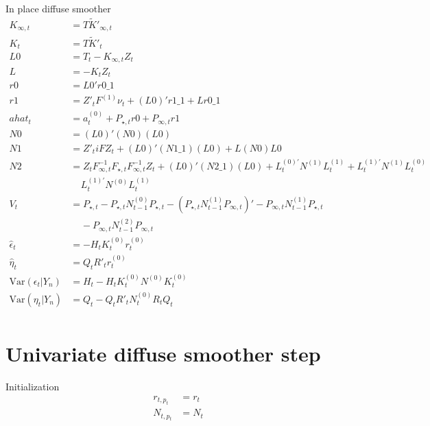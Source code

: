 \documentclass{article}
\begin{document}
In place diffuse smoother
\begin{align*}
  K_{\infty,t} &= T\tilde K'_{\infty,t} \\
  K_t &= T\tilde K'_t \\
  L0 &= T_t - K_{\infty,t}Z_t \\
  L &= - K_tZ_t \\
  r0 &= L0'r0\_1 \\
  r1 &= Z'_tF^{(1)}\nu_t + (L0)'r1\_1 +
                  Lr0\_1 \\
    ahat_t &= a^{(0)}_t + P_{\star,t}r0  +
             P_{\infty,t}r1 \\
  N0 &= (L0)'(N0)(L0) \\
  N1 &= Z'_tiFZ_t + (L0)'(N1\_1)(L0)
                  +L(N0)L0
                  \\
  N2 &= Z_tF^{-1}_{\infty,t}F_{\star,t}F^{-1}_{\infty,t}Z_t + (L0)'(N2\_1)(L0) +
                  L^{(0)'}_tN^{(1)}L^{(1)}_t +
                  L^{(1)'}_tN^{(1)}L^{(0)}_t \\
  &\;\;\;\;  L^{(1)'}_tN^{(0)}L^{(1)}_t \\
  V_t &= P_{\star,t} - P_{\star,t}N^{(0)}_{t-1}P_{\star,t} -
        (P_{\star,t}N^{(1)}_{t-1}P_{\infty,t})' -
        P_{\infty,t}N^{(1)}_{t-1}P_{\star,t}\\
  &\;\;\;\;-P_{\infty,t}N^{(2)}_{t-1}P_{\infty,t} \\
  \hat\epsilon_t &= -H_tK^{(0)}_tr^{(0)}_t \\
  \hat\eta_t &= Q_tR'_tr^{(0)}_t\\
  \mbox{Var}(\epsilon_t|Y_n) &= H_t - H_tK^{(0)}_tN^{(0)}K^{(0)}_t\\
  \mbox{Var}(\eta_t|Y_n) &= Q_t - Q_tR'_tN^{(0)}_tR_tQ_t \\
\end{align*}

\section{Univariate diffuse smoother step}
Initialization
\begin{align*}
  r_{t, p_t} &= r_t \\
  N_{t,p_t} &= N_t
\end{align*}
\end{document}
